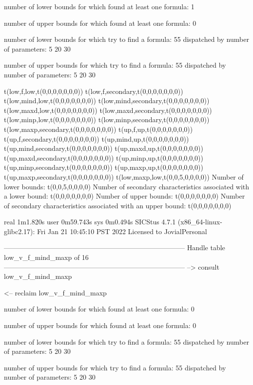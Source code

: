 number of lower bounds for which found at least one formula: 1

number of upper bounds for which found at least one formula: 0

number of lower bounds for which try to find a formula: 55
dispatched by number of parameters: 5  20  30

number of upper bounds for which try to find a formula: 55
dispatched by number of parameters: 5  20  30

t(low,f,low,t(0,0,0,0,0,0,0))
t(low,f,secondary,t(0,0,0,0,0,0,0))
t(low,mind,low,t(0,0,0,0,0,0,0))
t(low,mind,secondary,t(0,0,0,0,0,0,0))
t(low,maxd,low,t(0,0,0,0,0,0,0))
t(low,maxd,secondary,t(0,0,0,0,0,0,0))
t(low,minp,low,t(0,0,0,0,0,0,0))
t(low,minp,secondary,t(0,0,0,0,0,0,0))
t(low,maxp,secondary,t(0,0,0,0,0,0,0))
t(up,f,up,t(0,0,0,0,0,0,0))
t(up,f,secondary,t(0,0,0,0,0,0,0))
t(up,mind,up,t(0,0,0,0,0,0,0))
t(up,mind,secondary,t(0,0,0,0,0,0,0))
t(up,maxd,up,t(0,0,0,0,0,0,0))
t(up,maxd,secondary,t(0,0,0,0,0,0,0))
t(up,minp,up,t(0,0,0,0,0,0,0))
t(up,minp,secondary,t(0,0,0,0,0,0,0))
t(up,maxp,up,t(0,0,0,0,0,0,0))
t(up,maxp,secondary,t(0,0,0,0,0,0,0))
t(low,maxp,low,t(0,0,5,0,0,0,0))
Number of lower bounds:                                             t(0,0,5,0,0,0,0)
Number of secondary characteristics associated with a lower bound:  t(0,0,0,0,0,0,0)
Number of upper bounds:                                             t(0,0,0,0,0,0,0)
Number of secondary characteristics associated with an upper bound: t(0,0,0,0,0,0,0)

real	1m1.820s
user	0m59.743s
sys	0m0.494s
SICStus 4.7.1 (x86_64-linux-glibc2.17): Fri Jan 21 10:45:10 PST 2022
Licensed to JovialPersonal


--------------------------------------------------------------------------------
Handle table low_v_f_mind_maxp of 16
--------------------------------------------------------------------------------
--> consult low_v_f_mind_maxp

<-- reclaim low_v_f_mind_maxp

number of lower bounds for which found at least one formula: 0

number of upper bounds for which found at least one formula: 0

number of lower bounds for which try to find a formula: 55
dispatched by number of parameters: 5  20  30

number of upper bounds for which try to find a formula: 55
dispatched by number of parameters: 5  20  30

